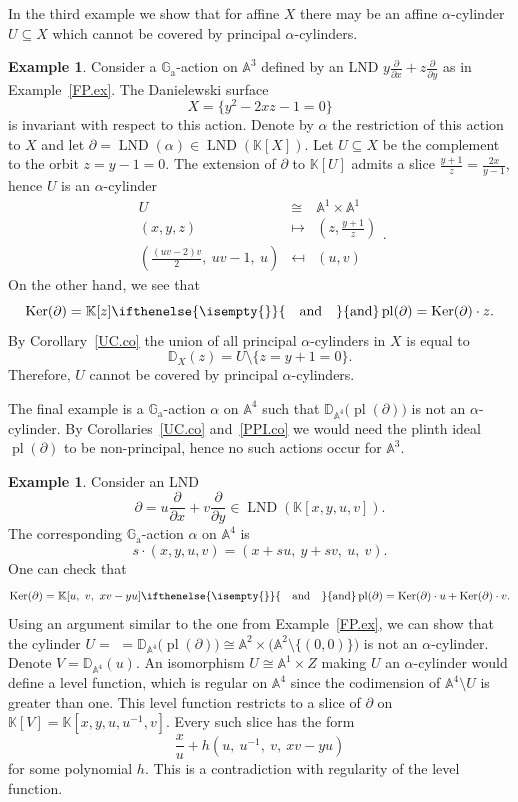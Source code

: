 \documentclass[a4paper, 12pt, reqno]{amsart}
\newcommand{\bb}{\mathbb}
\newcommand{\der}{\partial}
\newcommand{\Ga}{\bb{G}_\mathrm{a}}
\DeclareMathOperator{\Ker}{Ker}
\DeclareMathOperator{\LND}{LND}
\DeclareMathOperator{\pl}{pl}
\newcommand{\insertText}[2][]{%
    \ifthenelse{\isempty{#1}}{%
        \quad \text{#2} \quad%
    }{%
        #1 \text{#2} #1%
    }%
}
\theoremstyle{definition}
\newtheorem{exam}[counter]{Example}
\theoremstyle{plain}
\begin{document}
In the third example we show that for affine $X$ there may be an affine $\alpha$-cylinder $U \subseteq X$ which cannot be covered by principal $\alpha$-cylinders.

\begin{exam}
Consider a $\Ga$-action on $\bb{A}^3$ defined by an LND $y \frac{\der}{\der x} + z \frac{\der}{\der y}$ as in Example~\ref{FP.ex}. The Danielewski surface
$$
X = \{ y^2 - 2 x z - 1 = 0 \}
$$
is invariant with respect to this action. Denote by $\alpha$ the restriction of this action to $X$ and let $\der = \LND(\alpha) \in \LND(\bb{K}[X])$. Let $U \subseteq X$ be the complement to the orbit $z = y - 1 = 0$. The extension of $\der$ to $\bb{K}[U]$ admits a slice $\frac{y + 1}{z} = \frac{2 x}{y - 1}$, hence $U$ is an $\alpha$-cylinder
$$
\begin{array}{rcl}
U & \cong & \bb{A}^1 \times \bb{A}^1
\\
(x, y, z) & \mapsto & \left( z, \frac{y + 1}{z} \right)
\\
\left( \frac{ (u v - 2) v }{2}, \ u v - 1 , \ u \right) &
\mapsfrom & (u, v)
\end{array}
.
$$
On the other hand, we see that
$$
\Ker(\der) = \bb{K}[z]
\insertText{and}
\pl(\der) = \Ker(\der) \cdot z.
$$
By Corollary~\ref{UC.co} the union of all principal $\alpha$-cylinders in $X$ is equal to
$$
\bb{D}_X(z) = U \setminus \{ z = y + 1 = 0 \}.
$$
Therefore, $U$ cannot be covered by principal $\alpha$-cylinders.
\end{exam}

The final example is a $\Ga$-action $\alpha$ on $\bb{A}^4$ such that $\bb{D}_{\bb{A}^4} \big( \pl(\der) \big)$ is not an $\alpha$-cylinder. By Corollaries~\ref{UC.co} and~\ref{PPI.co} we would need the plinth ideal $\pl(\der)$ to be non-principal, hence no such actions occur for $\bb{A}^3$.

\begin{exam}
Consider an LND
$$
\der = u \frac{\der}{\der x} + v \frac{\der}{\der y} \in
\LND(\bb{K}[x, y, u, v]).
$$
The corresponding $\Ga$-action $\alpha$ on $\bb{A}^4$ is
$$
s \cdot (x, y, u, v) = (x + s u, \ y + s v, \ u, \ v).
$$
One can check that
$$
\Ker(\der) = \bb{K}[u, \ v, \ x v - y u]
\insertText{and}
\pl(\der) = \Ker(\der) \cdot u + \Ker(\der) \cdot v.
$$
Using an argument similar to the one from Example~\ref{FP.ex}, we can show that the cylinder $U =$
\linebreak
$= \bb{D}_{\bb{A}^4} \big( \pl(\der) \big) \cong \bb{A}^2 \times \big( \bb{A}^2 \setminus \{(0, 0)\} \big)$ is not an $\alpha$-cylinder. Denote $V = \bb{D}_{\bb{A}^4}(u)$. An isomorphism $U \cong \bb{A}^1 \times Z$ making $U$ an $\alpha$-cylinder would define a level function, which is regular on $\bb{A}^4$ since the codimension of $\bb{A}^4 \setminus U$ is greater than one. This level function restricts to a slice of $\der$ on $\bb{K}[V] = \bb{K}[x, y, u, u^{-1}, v]$. Every such slice has the form
$$
\frac{x}{u} + h(u, \ u^{-1}, \ v, \ x v - y u)
$$
for some polynomial $h$. This is a contradiction with regularity of the level function.
\end{exam}
\end{document}
